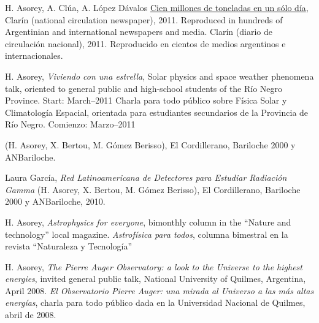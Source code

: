 H. Asorey, A. Clúa, A. López Dávalos \href{http://www.clarin.com/sociedad/Cien-millones-toneladas-cenizas-solo_0_517148395.html}{Cien millones de toneladas en un sólo día}, 
\ifeng
Clarín (national circulation newspaper), 2011.
Reproduced in hundreds of Argentinian and international newspapers and media.
\else
Clarín (diario de circulación nacional), 2011.
Reproducido en cientos de medios argentinos e internacionales.
\fi

H. Asorey, {\emph{Viviendo con una estrella}}, 
\ifeng 
Solar physics and space weather phenomena talk, oriented to general public and high-school students of the Río Negro Province.
Start: March--2011
\else
Charla para todo público sobre Física Solar y Climatología Espacial, orientada para estudiantes secundarios de la Provincia de Río Negro.
Comienzo: Marzo--2011
\fi

 (H. Asorey, X. Bertou, M. Gómez Berisso), El Cordillerano, Bariloche 2000 y ANBariloche.

Laura García, {\emph{Red Latinoamericana de Detectores para Estudiar Radiación Gamma}} (H. Asorey, X. Bertou, M. Gómez Berisso), El Cordillerano, Bariloche 2000 y ANBariloche, 2010.

H. Asorey, 
\ifeng
{\emph{Astrophysics for everyone}}, bimonthly column in the ``Nature and technology'' local magazine. \else
{\emph{Astrofísica para todos}}, columna bimestral en la revista ``Naturaleza y Tecnología''
\fi

H. Asorey, 
\ifeng
{\emph{The Pierre Auger Observatory: a look to the Universe to the highest energies}}, invited general public talk, National University of Quilmes, Argentina, April 2008.
\else
{\emph{El Observatorio Pierre Auger: una mirada al Universo a las más altas energías}}, charla para todo público dada en la Universidad Nacional de Quilmes, abril de 2008.
\fi
